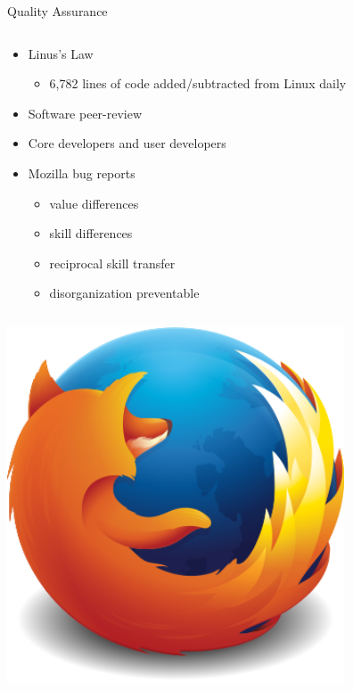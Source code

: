\begin{frame}{Quality Assurance}
  \begin{column}{.6\textwidth}
    \begin{itemize}
      \item Linus's Law
        \begin{itemize}
          \item 6,782 lines of code added/subtracted from Linux daily \cite[12:03]{zemlin}
        \end{itemize}
      \item Software peer-review
      \item Core developers and user developers
      \item Mozilla bug reports \cite[p. 352]{wang}
        \begin{itemize}
          \item value differences
          \item skill differences
          \item reciprocal skill transfer
          \item disorganization preventable
        \end{itemize}
    \end{itemize}
  \end{column}
  \begin{column}{.4\textwidth}\raggedleft
    \includegraphics[width = 0.75\textwidth]{fox.png}
  \end{column}
\end{frame}

